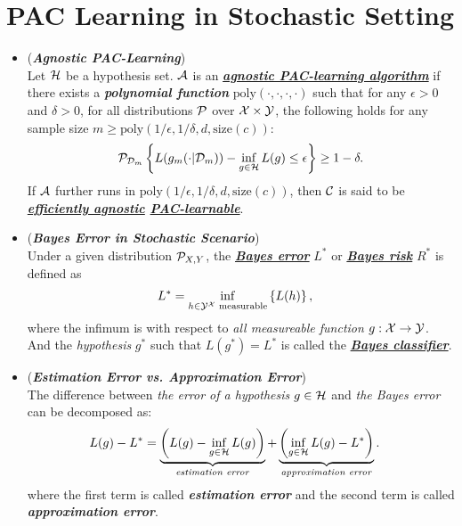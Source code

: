 \documentclass[11pt]{article}
\begin{document}
\section{PAC Learning in Stochastic Setting}
\begin{itemize}
\item \begin{definition} (\emph{\textbf{Agnostic PAC-Learning}})\\
Let ${\mathcal H}$ be a hypothesis set. ${\mathcal A}$ is an \underline{\emph{\textbf{agnostic PAC-learning algorithm}}} if there
exists a \emph{\textbf{polynomial function}} $\text{poly}(\cdot, \cdot, \cdot, \cdot)$  such that for any $\epsilon > 0$ and $\delta > 0$,
for all distributions ${\mathcal P}$ over ${\mathcal X} \times {\mathcal Y}$, the following holds for any sample size $m \ge \text{poly}(1/\epsilon, 1/\delta, d, \text{size}(c))$:
\begin{align}
{\mathcal P}_{{\mathcal D}_m}\left\{L(g_m(\cdot| {\mathcal D}_{m})) - \inf_{g \in {\mathcal H}}L(g)  \le \epsilon \right\} \ge 1 - \delta. \label{eqn: agnostic_pac_definition}
\end{align} If ${\mathcal A}$ further runs in $\text{poly}(1/\epsilon, 1/\delta, d, \text{size}(c))$, then ${\mathcal C}$ is said to be \emph{\textbf{\underline{efficiently agnostic} \underline{PAC-learnable}}}. 
\end{definition}

\item  \begin{definition} (\emph{\textbf{Bayes Error in Stochastic Scenario}})\\
Under a given distribution ${\mathcal P}_{X, Y}$,  the \underline{\emph{\textbf{Bayes error}}} $L^{*}$ or \underline{\emph{\textbf{Bayes risk}}} $R^{*}$ is defined as 
\begin{align}
 L^{*} &= \inf_{h \in {\mathcal Y}^{{\mathcal X}} \text{ measurable}}\left\{L(h)\right\}, \label{expr: Bayes_err}
\end{align} where the infimum is with respect to \emph{all measureable function} $g: {\mathcal X} \rightarrow {\mathcal Y}$. And the \emph{hypothesis} $g^{*}$ such that $L(g^{*})= L^{*}$ is called the \underline{\emph{\textbf{Bayes classifier}}}.
\end{definition}

\item \begin{remark} (\emph{\textbf{Estimation Error vs. Approximation Error}})\\
The difference between \emph{the error of a hypothesis} $g \in {\mathcal H}$ and \emph{the Bayes error} can be decomposed as:
\begin{align*}
L(g) - L^{*} &=\underbrace{\left(L(g) - \inf_{g \in {\mathcal H}}L(g)\right)}_{\text{\emph{estimation error}}} + \underbrace{\left(\inf_{g \in {\mathcal H}}L(g) - L^{*}\right)}_{\text{\emph{approximation error}}}.
\end{align*} 
where the first term is called \emph{\textbf{estimation error}} and the second term is called \emph{\textbf{approximation error}}.  


\end{remark}
\end{itemize}
\end{document}
